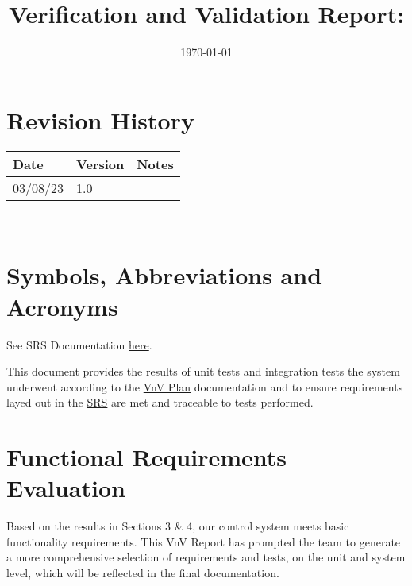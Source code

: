 \documentclass[12pt, titlepage]{article}
\begin{document}
\title{Verification and Validation Report: \progname} 
\author{\authname}
\date{\today}
	
\maketitle


\section*{Revision History}

\begin{tabularx}{\textwidth}{p{3cm}p{2cm}X}
\toprule {\bf Date} & {\bf Version} & {\bf Notes}\\
\midrule
03/08/23 & 1.0 & \\
\bottomrule
\end{tabularx}

~\newpage

\section*{Symbols, Abbreviations and Acronyms}

See SRS Documentation \href{https://github.com/Dharakverma/vehicle_control_system/blob/main/docs/SRS/SRS.pdf}{here}.

\newpage

\tableofcontents


\listoffigures %

\newpage


This document provides the results of unit tests and integration tests the system underwent according to the \href{https://github.com/Dharakverma/vehicle_control_system/blob/main/docs/VnVPlan/VnV_Plan.pdf}{VnV Plan} documentation and to ensure requirements layed out in the \href{https://github.com/Dharakverma/vehicle_control_system/blob/main/docs/SRS/SRS.pdf}{SRS} are met and traceable to tests performed.

\section{Functional Requirements Evaluation}

Based on the results in Sections 3 \& 4, our control system meets basic functionality requirements. This VnV Report has prompted the team to generate a more comprehensive selection of requirements and tests, on the unit and system level, which will be reflected in the final documentation.
\end{document}
